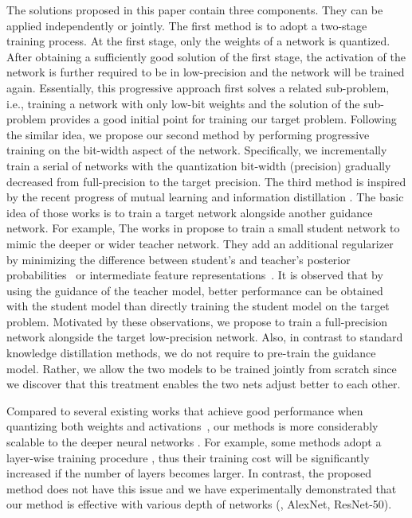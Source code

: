 The solutions proposed in this paper contain three components. They can be applied independently or jointly. The first method is to adopt a two-stage training process. At the first stage, only the weights of a network is quantized. After obtaining a sufficiently good solution of the first stage, the activation of the network is further required to be in low-precision and the network will be trained again. Essentially, this progressive approach first solves a related sub-problem, i.e., training a network with only low-bit weights and the solution of the sub-problem provides a good initial point for training our target problem. Following the similar idea, we propose our second method by performing progressive training on the bit-width aspect of the network. Specifically, we incrementally train a serial of networks with the quantization bit-width (precision) gradually decreased from full-precision to the target precision. The third method is inspired by the recent progress of mutual learning \cite{zhang2017deep} and information distillation \cite{romero2014fitnets, hinton2015distilling, parisotto2016actor, zagoruyko2016paying, ba2014deep}. The basic idea of those works is to train a target network alongside another guidance network. For example, The works in \cite{romero2014fitnets, hinton2015distilling, parisotto2016actor, zagoruyko2016paying, ba2014deep} propose to train a small student network to mimic the deeper or wider teacher network. They add an additional regularizer by minimizing the difference between student's and teacher's posterior probabilities~\cite{hinton2015distilling} or intermediate feature representations~\cite{ba2014deep, romero2014fitnets}. It is observed that by using the guidance of the teacher model, better performance can be obtained with the student model than directly training the student model on the target problem.  Motivated by these observations, we propose to train a full-precision network alongside the target low-precision network. Also, in contrast to standard knowledge distillation methods, we do not require to pre-train the guidance model. Rather, we allow the two models to be trained jointly from scratch since we discover that this treatment enables the two nets adjust better to each other. 

Compared to several existing works that achieve good performance when quantizing both weights and activations~\cite{wu2016quantized, zhou2016dorefa, hubara2016binarized, rastegari2016xnor}, our methods is more considerably scalable to the deeper neural networks \cite{he2016deep, he2016identity}. For example, some methods adopt a layer-wise training procedure \cite{wu2016quantized}, thus their training cost will be significantly increased if the number of layers becomes larger. In contrast, the proposed method does not have this issue and we have experimentally demonstrated that our method is effective with various depth of networks (\ie, AlexNet, ResNet-50).



%
%
%
%
%
%



%
%
%
%
%
%
%
%
%
%
%
%
%
%
%
%
%
